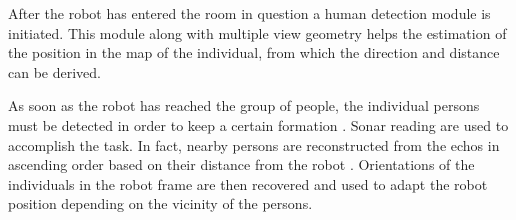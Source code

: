 After the robot has entered the room in question a human detection module is initiated. This module along with multiple view geometry helps the estimation of the position in the map of the individual, from which the direction and distance can be derived.

As soon as the robot has reached the group of people, the individual persons must be detected in order to keep a certain formation \cite{paper:JOINDISCUSSION}. Sonar reading are used to accomplish the task. In fact, nearby persons are reconstructed from the echos in ascending order based on their distance from the robot \cite{paper:JOINDISCUSSION}. Orientations of the individuals in the robot frame are then recovered and used to adapt the robot position depending on the vicinity of the persons.